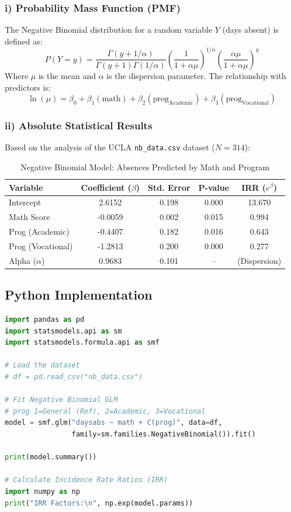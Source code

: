 \documentclass[12pt]{article}
\begin{document}
\subsubsection{i) Probability Mass Function (PMF)}
The Negative Binomial distribution for a random variable $Y$ (days absent) is defined as:
\[ P(Y=y) = \frac{\Gamma(y + 1/\alpha)}{\Gamma(y+1)\Gamma(1/\alpha)} \left(\frac{1}{1+\alpha\mu}\right)^{1/\alpha} \left(\frac{\alpha\mu}{1+\alpha\mu}\right)^y \]
Where $\mu$ is the mean and $\alpha$ is the dispersion parameter. The relationship with predictors is:
\[ \ln(\mu) = \beta_0 + \beta_1(\text{math}) + \beta_2(\text{prog}_{\text{Academic}}) + \beta_3(\text{prog}_{\text{Vocational}}) \]

\subsubsection{ii) Absolute Statistical Results}
Based on the analysis of the UCLA \texttt{nb\_data.csv} dataset ($N=314$):

\begin{table}[h!]
\centering
\caption{Negative Binomial Model: Absences Predicted by Math and Program}
\begin{tabular}{@{}lcccc@{}}
\toprule
\textbf{Variable} & Coefficient ($\beta$) & Std. Error & P-value & \textbf{IRR} ($e^\beta$) \\ \midrule
Intercept & 2.6152 & 0.198 & 0.000 & 13.670 \\
Math Score & -0.0059 & 0.002 & 0.015 & 0.994 \\
Prog (Academic) & -0.4407 & 0.182 & 0.016 & 0.643 \\
Prog (Vocational) & -1.2813 & 0.200 & 0.000 & 0.277 \\ \midrule
Alpha ($\alpha$) & 0.9683 & 0.101 & -- & (Dispersion) \\ \bottomrule
\end{tabular}
\end{table}

\subsection{Python Implementation}
\begin{lstlisting}[language=Python, caption=Python Negative Binomial Regression]
import pandas as pd
import statsmodels.api as sm
import statsmodels.formula.api as smf

# Load the dataset
# df = pd.read_csv("nb_data.csv")

# Fit Negative Binomial GLM
# prog 1=General (Ref), 2=Academic, 3=Vocational
model = smf.glm("daysabs ~ math + C(prog)", data=df, 
                family=sm.families.NegativeBinomial()).fit()

print(model.summary())

# Calculate Incidence Rate Ratios (IRR)
import numpy as np
print("IRR Factors:\n", np.exp(model.params))
\end{lstlisting}
\end{document}
